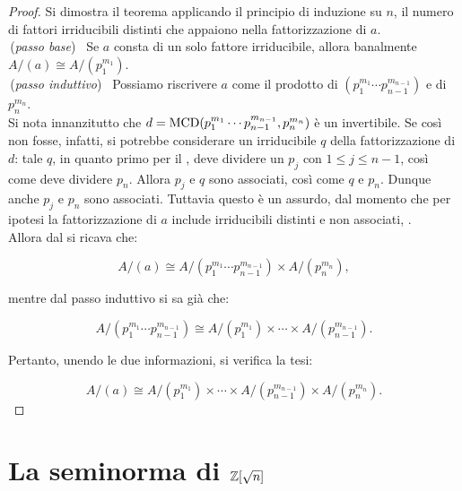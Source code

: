     \begin{proof}
        Si dimostra il teorema applicando il principio di induzione su $n$,
        il numero di fattori irriducibili distinti che appaiono
        nella fattorizzazione di $a$. \\
        
        \,(\textit{passo base}) \, Se $a$ consta di un solo fattore irriducibile,
        allora banalmente $A/(a) \cong A/(p_1^{m_1})$. \\
        
        \,(\textit{passo induttivo}) \, Possiamo riscrivere $a$ come
        il prodotto di $(p_1^{m_1}\cdots p_{n-1}^{m_{n-1}})$ e di
        $p_n^{m_n}$. \\
        
        Si nota innanzitutto che $d = \operatorname{MCD}(p_1^{m_1}\cdots p_{n-1}^{m_{n-1}}, p_n^{m_n})$
        è un invertibile. Se così non fosse, infatti, si potrebbe
        considerare un irriducibile $q$ della fattorizzazione di $d$:
        tale $q$, in quanto primo per il ,
        deve dividere un $p_j$ con $1 \leq j \leq n-1$, così
        come deve dividere $p_n$. Allora $p_j$ e $q$ sono associati,
        così come $q$ e $p_n$. Dunque anche $p_j$ e $p_n$ sono associati.
        Tuttavia questo è un assurdo, dal momento che per ipotesi
        la fattorizzazione di $a$ include irriducibili distinti e
        non associati, \Lightning{}. \\
        
        Allora dal  si ricava che:
        
        \[ A/(a) \cong A/(p_1^{m_1}\cdots p_{n-1}^{m_{n-1}}) \times A/(p_n^{m_n}), \]
        
        \vskip 0.1in
        
        mentre dal passo induttivo si sa già che:
        
        \[ A/(p_1^{m_1}\cdots p_{n-1}^{m_{n-1}}) \cong A/(p_1^{m_1}) \times \cdots \times A/(p_{n-1}^{m_{n-1}}). \]
        
        \vskip 0.1in
        
        Pertanto, unendo le due informazioni, si verifica la tesi:
        
            \[ A/(a) \cong
            A/(p_1^{m_1}) \times \cdots \times A/(p_{n-1}^{m_{n-1}}) \times A/(p_n^{m_n}). \]
        
    \end{proof}

\section{La seminorma di \texorpdfstring{$\mathbb Z[\sqrt{n}]$}{Z[√n]}}

